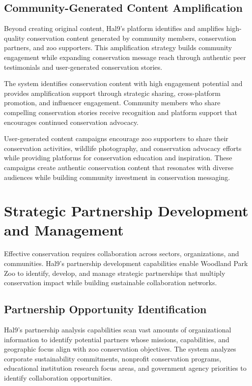 \documentclass[
  Letterpaper,
]{scrbook}
\begin{document}
\subsection{Community-Generated Content
Amplification}\label{community-generated-content-amplification}

Beyond creating original content, Hal9's platform identifies and
amplifies high-quality conservation content generated by community
members, conservation partners, and zoo supporters. This amplification
strategy builds community engagement while expanding conservation
message reach through authentic peer testimonials and user-generated
conservation stories.

The system identifies conservation content with high engagement
potential and provides amplification support through strategic sharing,
cross-platform promotion, and influencer engagement. Community members
who share compelling conservation stories receive recognition and
platform support that encourages continued conservation advocacy.

User-generated content campaigns encourage zoo supporters to share their
conservation activities, wildlife photography, and conservation advocacy
efforts while providing platforms for conservation education and
inspiration. These campaigns create authentic conservation content that
resonates with diverse audiences while building community investment in
conservation messaging.

\section{Strategic Partnership Development and
Management}\label{strategic-partnership-development-and-management}

Effective conservation requires collaboration across sectors,
organizations, and communities. Hal9's partnership development
capabilities enable Woodland Park Zoo to identify, develop, and manage
strategic partnerships that multiply conservation impact while building
sustainable collaboration networks.

\subsection{Partnership Opportunity
Identification}\label{partnership-opportunity-identification}

Hal9's partnership analysis capabilities scan vast amounts of
organizational information to identify potential partners whose
missions, capabilities, and geographic focus align with zoo conservation
objectives. The system analyzes corporate sustainability commitments,
nonprofit conservation programs, educational institution research focus
areas, and government agency priorities to identify collaboration
opportunities.
\end{document}

